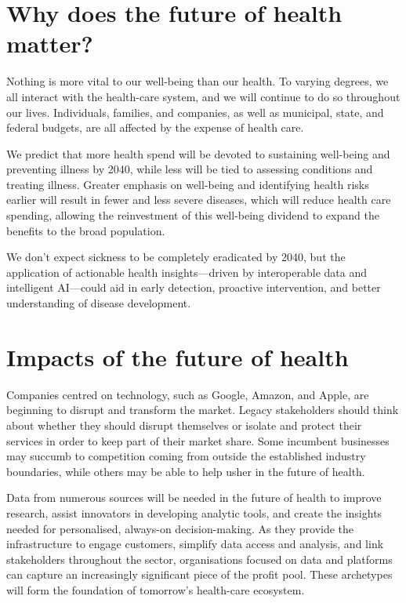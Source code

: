 \documentclass[11pt]{article}
\begin{document}
\section{Why does the future of health matter?}

Nothing is more vital to our well-being than our health. To varying degrees, we all interact with the health-care system, and we will continue to do so throughout our lives. Individuals, families, and companies, as well as municipal, state, and federal budgets, are all affected by the expense of health care.


We predict that more health spend will be devoted to sustaining well-being and preventing illness by 2040, while less will be tied to assessing conditions and treating illness. Greater emphasis on well-being and identifying health risks earlier will result in fewer and less severe diseases, which will reduce health care spending, allowing the reinvestment of this well-being dividend to expand the benefits to the broad population.


We don't expect sickness to be completely eradicated by 2040, but the application of actionable health insights—driven by interoperable data and intelligent AI—could aid in early detection, proactive intervention, and better understanding of disease development.


\section{Impacts of the future of health}

Companies centred on technology, such as Google, Amazon, and Apple, are beginning to disrupt and transform the market. Legacy stakeholders should think about whether they should disrupt themselves or isolate and protect their services in order to keep part of their market share. Some incumbent businesses may succumb to competition coming from outside the established industry boundaries, while others may be able to help usher in the future of health.


Data from numerous sources will be needed in the future of health to improve research, assist innovators in developing analytic tools, and create the insights needed for personalised, always-on decision-making. As they provide the infrastructure to engage customers, simplify data access and analysis, and link stakeholders throughout the sector, organisations focused on data and platforms can capture an increasingly significant piece of the profit pool. These archetypes will form the foundation of tomorrow's health-care ecosystem.
\end{document}
